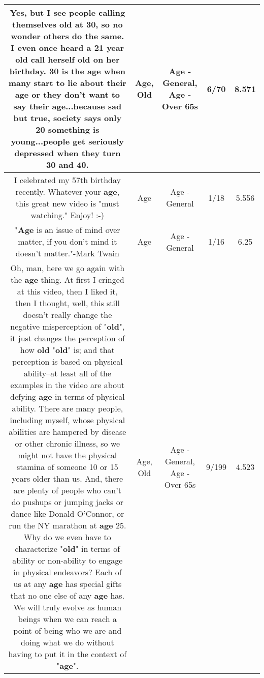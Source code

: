 \documentclass[11pt]{article}
\newlength\mylength
\begin{document}
\begin{center}
\begin{longtable}{|C{.65\mylength}|C{.30\mylength}|C{.12\mylength}|C{.12\mylength}|C{.12\mylength}|}
  \small Yes, but I see people calling themselves \textbf{old} at 30, so no wonder others do the same.  I even once heard a 21 year \textbf{old} call herself \textbf{old} on her birthday.  30 is the \textbf{age} when many start to lie about their \textbf{age} or they don't want to say their \textbf{age}...because sad but true, society says only 20 something is young...people get seriously depressed when they turn 30 and 40.\normalsize   & Age, Old & Age - General, Age - Over 65s & 6/70 & 8.571 \\  \hline
  \small I celebrated my 57th birthday recently. Whatever your \textbf{age}, this great new video is "must watching." Enjoy! :-)\normalsize   & Age & Age - General & 1/18 & 5.556 \\  \hline
  \small "\textbf{Age} is an issue of mind over matter, if you don't mind it doesn't matter."-Mark Twain\normalsize   & Age & Age - General & 1/16 & 6.25 \\  \hline
  \small Oh, man, here we go again with the \textbf{age} thing. At first I cringed at this video, then I liked it, then I thought, well, this still doesn't really change the negative misperception of "\textbf{old}", it just changes the perception of how \textbf{old} "\textbf{old}" is; and that perception is based on physical ability--at least all of the examples in the video are about defying \textbf{age} in terms of physical ability. There are many people, including myself, whose physical abilities are hampered by disease or other chronic illness, so we might not have the physical stamina of someone 10 or 15 years older than us. And, there are plenty of people who can't do pushups or jumping jacks or dance like Donald O'Connor, or run the NY marathon at \textbf{age} 25. Why do we even have to characterize "\textbf{old}" in terms of ability or non-ability to engage in physical endeavors? Each of us at any \textbf{age} has special gifts that no one else of any \textbf{age} has. We will truly evolve as human beings when we can reach a point of being who we are and doing what we do without having to put it in the context of "\textbf{age}".\normalsize   & Age, Old & Age - General, Age - Over 65s & 9/199 & 4.523 \\  \hline

\end{longtable}
\end{center}
\end{document}
